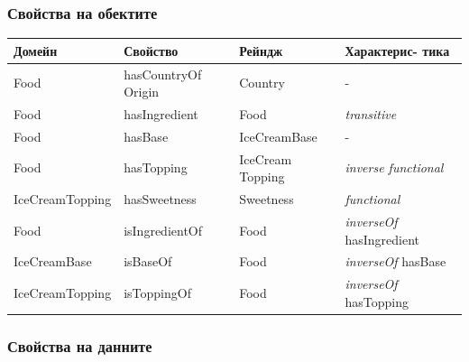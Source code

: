 \documentclass[12pt]{article}
\begin{document}
        \subsubsection{Свойства на обектите}
    
            \begin{table}[htbp]
                \centering
                \begin{tabularx}{\textwidth}{| X | X | X | X |}
                    \hline
                    \textbf{Домейн}          & \textbf{Свойство}     & \textbf{Рейндж}     & \textbf{Характерис- тика}         \\ \hline
                            
                    Food            & hasCountryOf Origin & Country         &           -                         \\ \hline
                    Food            & hasIngredient      & Food             & \textit{transitive}                 \\ \hline
                    Food            & hasBase            & IceCreamBase     &           -                         \\ \hline
                    Food            & hasTopping         & IceCream Topping & \textit{inverse functional}         \\ \hline
                    IceCreamTopping & hasSweetness       & Sweetness        & \textit{functional}                 \\ \hline
                    Food            & isIngredientOf     & Food             & \textit{inverseOf} hasIngredient    \\ \hline
                    IceCreamBase    & isBaseOf           & Food             & \textit{inverseOf} hasBase          \\ \hline
                    IceCreamTopping & isToppingOf        & Food             & \textit{inverseOf} hasTopping       \\ \hline
                            
                \end{tabularx}
            \end{table}
    
        \subsubsection{Свойства на данните}
    
\end{document}
